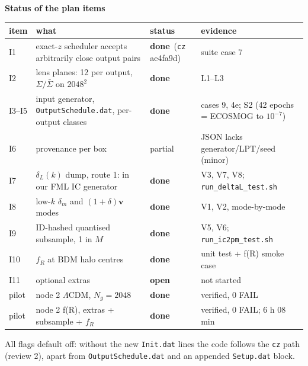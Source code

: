 \documentclass[UTF8]{beamer}
\newcommand{\done}{\textcolor{okgreen}{\textbf{done}}}
\newcommand{\open}{\textcolor{openrose}{\textbf{open}}}
\begin{document}
\begin{frame}{\textbf{Status of the plan items}}
  \scriptsize
  \begin{tabularx}{\textwidth}{@{}l X l l@{}}
    \toprule
    item & what & status & evidence \\
    \midrule
    I1 & exact-$z$ scheduler accepts arbitrarily close output pairs & \done\ (\texttt{cz} ae4fa9d) & suite case 7 \\
    I2 & lens planes: 12 per output, $\Sigma/\bar\Sigma$ on $2048^2$ & \done & L1--L3 \\
    I3--I5 & input generator, \texttt{OutputSchedule.dat}, per-output classes & \done & cases 9, 4e; S2 (42 epochs = ECOSMOG to $10^{-7}$) \\
    I6 & provenance per box & partial & JSON lacks generator/LPT/seed (minor) \\
    I7 & $\delta_L(k)$ dump, route 1: in our FML IC generator & \done & V3, V7, V8; \texttt{run\_deltaL\_test.sh} \\
    I8 & low-$k$ $\delta_m$ and $(1+\delta)\mathbf{v}$ modes & \done & V1, V2, mode-by-mode \\
    I9 & ID-hashed quantised subsample, 1 in $M$ & \done & V5, V6; \texttt{run\_ic2pm\_test.sh} \\
    I10 & $f_R$ at BDM halo centres & \done & unit test + f(R) smoke case \\
    I11 & optional extras & \open & not started \\
    \midrule
    pilot & node 2 $\Lambda$CDM, $N_g = 2048$ & \done & verified, 0 FAIL \\
    pilot & node 2 f(R), extras + subsample + $f_R$ & \done & verified, 0 FAIL; 6 h 08 min \\
    \bottomrule
  \end{tabularx}
  \smallskip
  All flags default off: without the new \texttt{Init.dat} lines the code follows the \texttt{cz} path
  (review 2), apart from \texttt{OutputSchedule.dat} and an appended \texttt{Setup.dat} block.
\end{frame}
\end{document}
